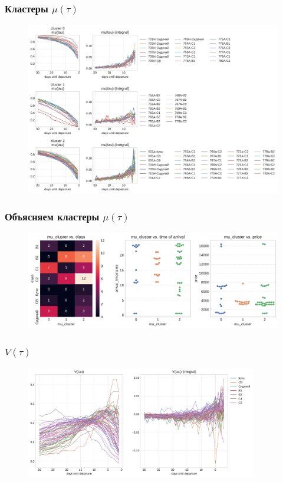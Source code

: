 \documentclass[11pt,aspectratio=169]{beamer}
\begin{document}
\begin{frame}
    \frametitle{Кластеры $\mu(\tau)$}

    \begin{figure}
        \centering
        \includegraphics[height=0.92\textheight]{../data/figures/mean_clusters.pdf}
    \end{figure}

\end{frame}


\begin{frame}
    \frametitle{Объясняем кластеры $\mu(\tau)$}

    \begin{figure}
        \centering
        \includegraphics[width=\textwidth]{../data/figures/explaining_mean_clusters.pdf}
    \end{figure}

\end{frame}


\begin{frame}
    \frametitle{$V(\tau)$}

    \begin{figure}
        \centering
        \includegraphics[width=0.9\textwidth]{../data/figures/eigenvectors.pdf}
    \end{figure}

\end{frame}
\end{document}
